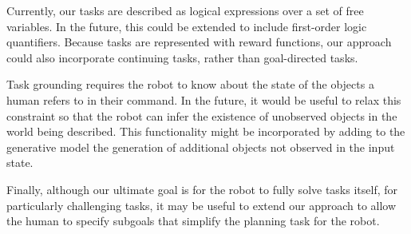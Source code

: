 \documentclass[conference]{IEEEtran}
\begin{document}
Currently, our tasks are described as logical expressions over a set of free variables. In the future, this could be extended to include first-order logic quantifiers. Because tasks are represented with reward functions, our approach could also incorporate continuing tasks, rather than goal-directed tasks.

Task grounding requires the robot to know about the state of the objects a human refers to in their command. In the future, it would be useful to relax this constraint so that the robot can infer the existence of unobserved objects in the world being described. This functionality might be incorporated by adding to the generative model the generation of additional objects not observed in the input state.

Finally, although our ultimate goal is for the robot to fully solve tasks itself, 
for particularly challenging tasks, it may be useful to extend our approach to allow the human to specify subgoals that simplify the planning task for the robot.




\end{document}
